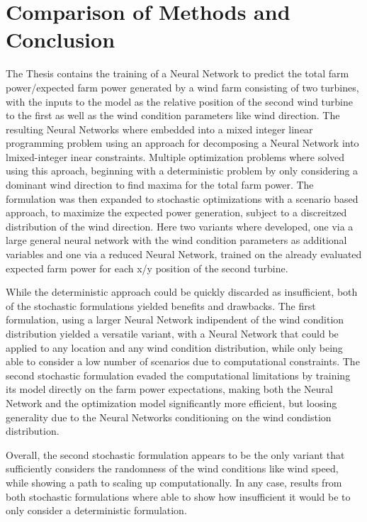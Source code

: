 
\chapter{Comparison of Methods and Conclusion}\label{chapter:conclusion}

The Thesis contains the training of a Neural Network to predict the total farm power/expected farm power generated by a wind farm consisting of two turbines, with the inputs to the model as the relative position of the second wind turbine to the first as well as the wind condition parameters like wind direction. The resulting Neural Networks where embedded into a mixed integer linear programming problem using an approach for decomposing a Neural Network into lmixed-integer inear constraints. Multiple optimization problems where solved using this aproach, beginning with a deterministic problem by only considering a dominant wind direction to find maxima for the total farm power. The formulation was then expanded to stochastic optimizations with a scenario based approach, to maximize the expected power generation, subject to a discreitzed distribution of the wind direction. Here two variants where developed, one via a large general neural network with the wind condition parameters as additional variables and one via a reduced Neural Network, trained on the already evaluated expected farm power for each x/y position of the second turbine. 

While the deterministic approach could be quickly discarded as insufficient, both of the stochastic formulations yielded benefits and drawbacks. The first formulation, using a larger Neural Network indipendent of the wind condition distribution yielded a versatile variant, with a Neural Network that could be applied to any location and any wind condition distribution, while only being able to consider a low number of scenarios due to computational constraints. The second stochastic formulation evaded the computational limitations by training its model directly on the farm power expectations, making both the Neural Network and the optimization model significantly more efficient, but loosing generality due to the Neural Networks conditioning on the wind condistion distribution.

Overall, the second stochastic formulation appears to be the only variant that sufficiently considers the randomness of the wind conditions like wind speed, while showing a path to scaling up computationally. In any case, results from both stochastic formulations where able to show how insufficient it would be to only consider a deterministic formulation.

